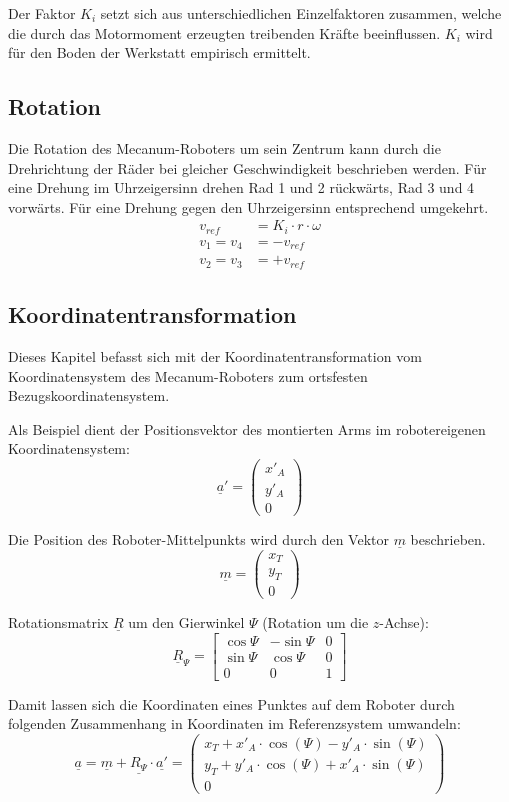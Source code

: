 Der Faktor $K_i$ setzt sich aus unterschiedlichen Einzelfaktoren zusammen, welche die durch das Motormoment erzeugten treibenden Kräfte beeinflussen. $K_i$ wird für den Boden der Werkstatt empirisch ermittelt.


\subsection{Rotation}
Die Rotation des Mecanum-Roboters um sein Zentrum kann durch die Drehrichtung der Räder bei gleicher Geschwindigkeit beschrieben werden.
Für eine Drehung im Uhrzeigersinn drehen Rad 1 und 2 rückwärts, Rad 3 und 4 vorwärts. Für eine Drehung gegen den Uhrzeigersinn entsprechend umgekehrt.
\begin{align*}
    v_{ref} &= K_i \cdot r \cdot \omega \\
    v_1 = v_4 &= - v_{ref}              \\
    v_2 = v_3 &= + v_{ref}
\end{align*}


\subsection{Koordinatentransformation}
Dieses Kapitel befasst sich mit der Koordinatentransformation vom Koordinatensystem des Mecanum-Roboters zum ortsfesten Bezugskoordinatensystem.

Als Beispiel dient der Positionsvektor des montierten Arms im robotereigenen Koordinatensystem:
$$
\underline a' =
    \begin{pmatrix}
        x'_A \\
        y'_A \\
        0
    \end{pmatrix}
$$

Die Position des Roboter-Mittelpunkts wird durch den Vektor $\underline m$ beschrieben.
$$
\underline m =
    \begin{pmatrix}
        x_T \\
        y_T \\
        0
    \end{pmatrix}
$$

Rotationsmatrix $\underline R$ um den Gierwinkel $\Psi$ (Rotation um die $z$-Achse):
$$
\underline R_{\Psi} =
    \begin{bmatrix}
        \cos{\Psi}  & -\sin{\Psi} & 0 \\
        \sin{\Psi} & \cos{\Psi} & 0 \\
        0 & 0 & 1
    \end{bmatrix}
$$

Damit lassen sich die Koordinaten eines Punktes auf dem Roboter durch folgenden Zusammenhang in Koordinaten im Referenzsystem umwandeln:
$$
\underline{a} = \underline{m} + \underline{R_\Psi} \cdot \underline{a'} =
\begin{pmatrix}
    x_T + x'_A \cdot \cos(\Psi) - y'_A \cdot \sin(\Psi) \\
    y_T + y'_A \cdot \cos(\Psi) + x'_A \cdot \sin(\Psi) \\
    0
\end{pmatrix}
$$
